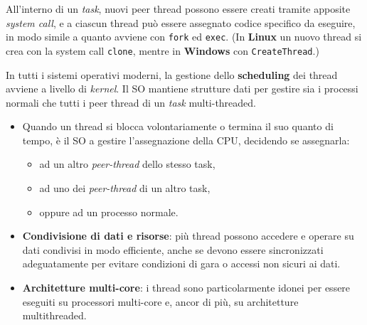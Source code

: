 All'interno di un \textit{task}, nuovi peer thread possono essere creati tramite apposite \textit{system call}, e a ciascun thread può essere assegnato codice specifico da eseguire, in modo simile a quanto avviene con \texttt{fork} ed \texttt{exec}. (In \textbf{Linux} un nuovo thread si crea con la system call \texttt{clone}, mentre in \textbf{Windows} con \texttt{CreateThread}.)


In tutti i sistemi operativi moderni, la gestione dello \textbf{scheduling} dei thread avviene a livello di \textit{kernel}. Il SO mantiene strutture dati per gestire sia i processi normali che tutti i peer thread di un \textit{task} multi-threaded.

\begin{itemize}
    \item Quando un thread si blocca volontariamente o termina il suo quanto di tempo, è il SO a gestire l'assegnazione della CPU, decidendo se assegnarla:
        \begin{itemize}
            \item ad un altro \textit{peer-thread} dello stesso task,
            \item ad uno dei \textit{peer-thread} di un altro task,
            \item oppure ad un processo normale.
        \end{itemize}
\end{itemize}

\begin{itemize}
    \item \textbf{Condivisione di dati e risorse}: più thread possono accedere e operare su dati condivisi in modo efficiente, anche se devono essere sincronizzati adeguatamente per evitare condizioni di gara o accessi non sicuri ai dati.
    \item \textbf{Architetture multi-core}: i thread sono particolarmente idonei per essere eseguiti su processori multi-core e, ancor di più, su architetture multithreaded.
\end{itemize}

